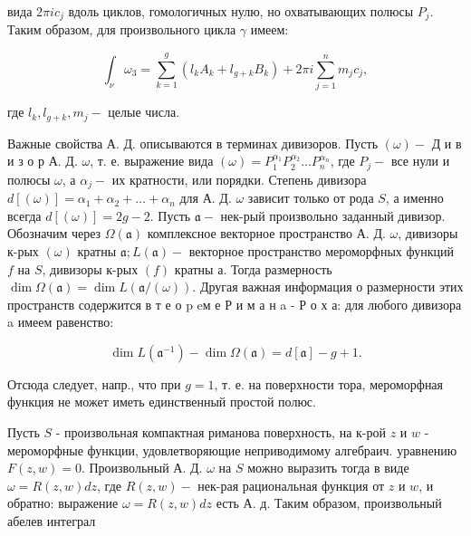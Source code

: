 \documentclass[10pt]{article}
\begin{document}
вида $2 \pi i c_{j}$ вдоль циклов, гомологичных нулю, но охватывающих полюсы $P_{j}$. Таким образом, для произвольного цикла $\gamma$ имеем:



\[

\int_{\nu} \omega_{3}=\sum_{k=1}^{g}\left(l_{k} A_{k}+l_{g+k} B_{k}\right)+2 \pi i \sum_{j=1}^{n} m_{j} c_{j},

\]



где $l_{k}, l_{g+k}, m_{j}-$ целые числа.



Важные свойства А. Д. описываются в терминах дивизоров. Пусть $(\omega)-$ Д и в и з о р А. Д. $\omega$, т. е. выражение вида $(\omega)=P_{1}^{\alpha_{1}} P_{2}^{\alpha_{2}} \ldots P_{n}^{\alpha_{n}}$, где $P_{j}-$ все нули и полюсы $\omega$, а $\alpha_{j}-$ их кратности, или порядки. Степень дивизора $d[(\omega)]=\alpha_{1}+\alpha_{2}+\ldots+\alpha_{n}$ для А. Д. $\omega$ зависит только от рода $S$, а именно всегда $d[(\omega)]=2 g-2$. Пусть $\mathfrak{a}-$ нек-рый произвольно заданный дивизор. Обозначим через $\Omega(\mathfrak{a})$ комплексное векторное пространство А. Д. $\omega$, дивизоры к-рых $(\omega)$ кратны $\mathfrak{a} ; L(\mathfrak{a})-$ векторное пространство мероморфных функций $f$ на $S$, дивизоры к-рых $(f)$ кратны $а$. Тогда размерность $\operatorname{dim} \Omega(\mathfrak{a})=\operatorname{dim} L(\mathfrak{a} /(\omega))$. Другая важная информация о размерности этих пространств содержится в т е о p eм е Р и м а н a - Р о х а: для любого дивизора a имеем равенство:



\[

\operatorname{dim} L\left(\mathfrak{a}^{-1}\right)-\operatorname{dim} \Omega(\mathfrak{a})=d[\mathfrak{a}]-g+1 .

\]



Отсюда следует, напр., что при $g=1$, т. е. на поверхности тора, мероморфная функция не может иметь единственный простой полюс.



Пусть $S$ - произвольная компактная риманова поверхность, на к-рой $z$ и $w$ - мероморфные функции, удовлетворяющие неприводимому алгебраич. уравнению $F(z, w)=0$. Произвольный А. Д. $\omega$ на $S$ можно выразить тогда в виде $\omega=R(z, w) d z$, где $R(z, w)-$ нек-рая рациональная функция от $z$ и $w$, и обратно: выражение $\omega=R(z, w) d z$ есть А. д. Таким образом, произвольный абелев интеграл
\end{document}
